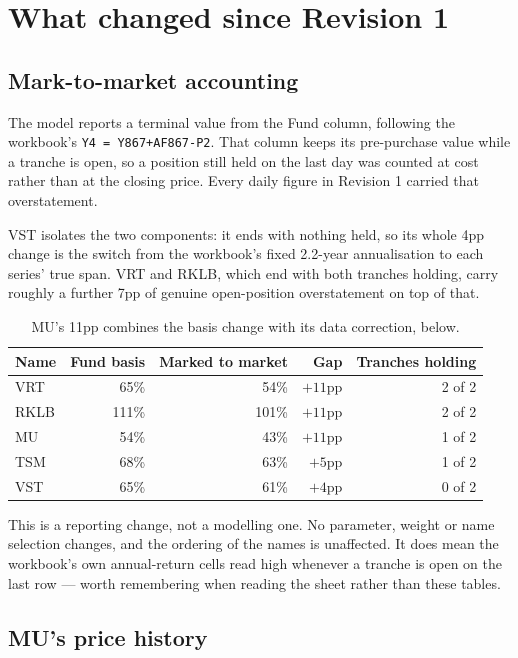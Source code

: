 \documentclass[11pt]{article}
\begin{document}
\section{What changed since Revision 1}

\subsection{Mark-to-market accounting}

The model reports a terminal value from the Fund column, following the workbook's
\texttt{Y4 = Y867+AF867-P2}. That column keeps its pre-purchase value while a tranche is open, so
a position still held on the last day was counted at cost rather than at the closing price. Every
daily figure in Revision 1 carried that overstatement.

VST isolates the two components: it ends with nothing held, so its whole 4pp change is the switch
from the workbook's fixed 2.2-year annualisation to each series' true span. VRT and RKLB, which
end with both tranches holding, carry roughly a further 7pp of genuine open-position
overstatement on top of that.

\begin{table}[H]\centering\small
\begin{tabular}{lrrrr}
\toprule
\textbf{Name} & \textbf{Fund basis} & \textbf{Marked to market} & \textbf{Gap} &
\textbf{Tranches holding}\\
\midrule
\rowcolor{bckeep} VRT  & 65\%  & 54\%  & $+11$pp & 2 of 2\\
RKLB & 111\% & 101\% & $+11$pp & 2 of 2\\
\rowcolor{bckeep} MU   & 54\%  & 43\%  & $+11$pp & 1 of 2\\
TSM  & 68\%  & 63\%  & $+5$pp  & 1 of 2\\
\rowcolor{bckeep} VST  & 65\%  & 61\%  & $+4$pp  & 0 of 2\\
\bottomrule
\end{tabular}
\caption{MU's 11pp combines the basis change with its data correction, below.}
\end{table}

This is a reporting change, not a modelling one. No parameter, weight or name selection changes,
and the ordering of the names is unaffected. It does mean the workbook's own annual-return cells
read high whenever a tranche is open on the last row --- worth remembering when reading the sheet
rather than these tables.

\subsection{MU's price history}
\end{document}

